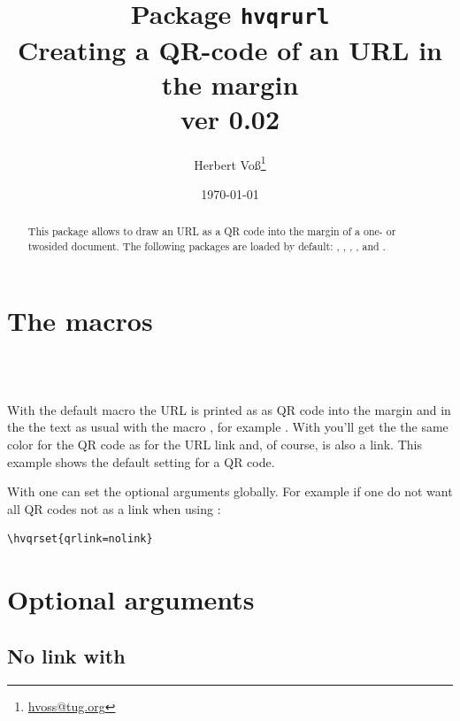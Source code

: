 \documentclass[twoside,usegeometry]{scrartcl}
\begin{document}
\title{Package \texttt{hvqrurl}\\Creating a QR-code of an URL in the margin \\\small ver 0.02}
\author{Herbert Voß\thanks{\protect\url{hvoss@tug.org}}}
\date{\today}
\maketitle


\begin{abstract}
This package allows to draw an URL as a QR code into the margin of a one- or twosided
document. The following packages are loaded by default:
, , , ,
and 
.
\end{abstract}


\section{The macros}


\begin{BDef}
\\
\\
\end{BDef}

With the default macro  the URL is printed as as QR code into the margin and
in the the text as usual with the macro , for example .
With  you'll get the the same color for the QR code as for  the URL link and, of course,
is also a link. This example shows the default setting for a QR code.

With  one can set the optional arguments globally. For example if one do not want all
QR codes not as a link when using :

\begin{lstlisting}
\hvqrset{qrlink=nolink} 
\end{lstlisting}


\section{Optional arguments}

\subsection{No link with }
\end{document}
